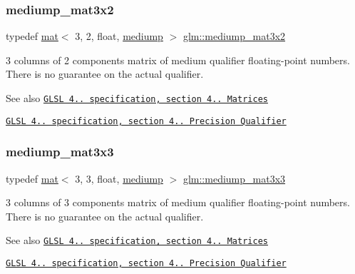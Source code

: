 \subsubsection{\texorpdfstring{mediump\+\_\+mat3x2}{mediump\_mat3x2}}
{\footnotesize\ttfamily typedef \hyperlink{structglm_1_1mat}{mat}$<$ 3, 2, float, \hyperlink{namespaceglm_a36ed105b07c7746804d7fdc7cc90ff25a6416f3ea0c9025fb21ed50c4d6620482}{mediump} $>$ \hyperlink{group__core__precision_ga1215c51719dd5e01efb27ff525e431fb}{glm\+::mediump\+\_\+mat3x2}}

3 columns of 2 components matrix of medium qualifier floating-\/point numbers. There is no guarantee on the actual qualifier.

\begin{DoxySeeAlso}{See also}
\href{http://www.opengl.org/registry/doc/GLSLangSpec.4.20.8.pdf}{\tt G\+L\+SL 4.. specification, section 4.. Matrices} 

\href{http://www.opengl.org/registry/doc/GLSLangSpec.4.20.8.pdf}{\tt G\+L\+SL 4.. specification, section 4.. Precision Qualifier} 
\end{DoxySeeAlso}
\mbox{\label{group__core__precision_ga774bbcb2f667fc0a91add50e55d8ac04}} 
\subsubsection{\texorpdfstring{mediump\+\_\+mat3x3}{mediump\_mat3x3}}
{\footnotesize\ttfamily typedef \hyperlink{structglm_1_1mat}{mat}$<$ 3, 3, float, \hyperlink{namespaceglm_a36ed105b07c7746804d7fdc7cc90ff25a6416f3ea0c9025fb21ed50c4d6620482}{mediump} $>$ \hyperlink{group__core__precision_ga774bbcb2f667fc0a91add50e55d8ac04}{glm\+::mediump\+\_\+mat3x3}}

3 columns of 3 components matrix of medium qualifier floating-\/point numbers. There is no guarantee on the actual qualifier.

\begin{DoxySeeAlso}{See also}
\href{http://www.opengl.org/registry/doc/GLSLangSpec.4.20.8.pdf}{\tt G\+L\+SL 4.. specification, section 4.. Matrices} 

\href{http://www.opengl.org/registry/doc/GLSLangSpec.4.20.8.pdf}{\tt G\+L\+SL 4.. specification, section 4.. Precision Qualifier} 
\end{DoxySeeAlso}
\mbox{\label{group__core__precision_ga61dd8c2c7fd60c1343a6b3aca7f86c25}} 
